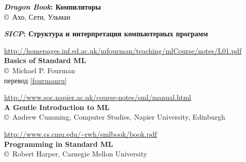 \begin{thebibliography}{99}


 \textbf{\emph{Dragon Book}: Компиляторы}\\
\copyright\ Ахо, Сети, Ульман

 \textbf{\emph{SICP}: Структура и интерпретация компьютерных
программ}


\url{http://homepages.inf.ed.ac.uk/mfourman/teaching/mlCourse/notes/L01.pdf}\\
\textbf{Basics of Standard ML}\\
\copyright\ Michael P. Fourman\\
перевод \ref{fourmanru}

\url{http://www.soc.napier.ac.uk/course-notes/sml/manual.html}\\
\textbf{A Gentle Introduction to ML}\\
\copyright\ Andrew Cumming, Computer Studies, Napier University, Edinburgh

 \url{http://www.cs.cmu.edu/~rwh/smlbook/book.pdf}\\
\textbf{Programming in Standard ML}\\
\copyright\ Robert Harper, Carnegie Mellon University

\end{thebibliography}
